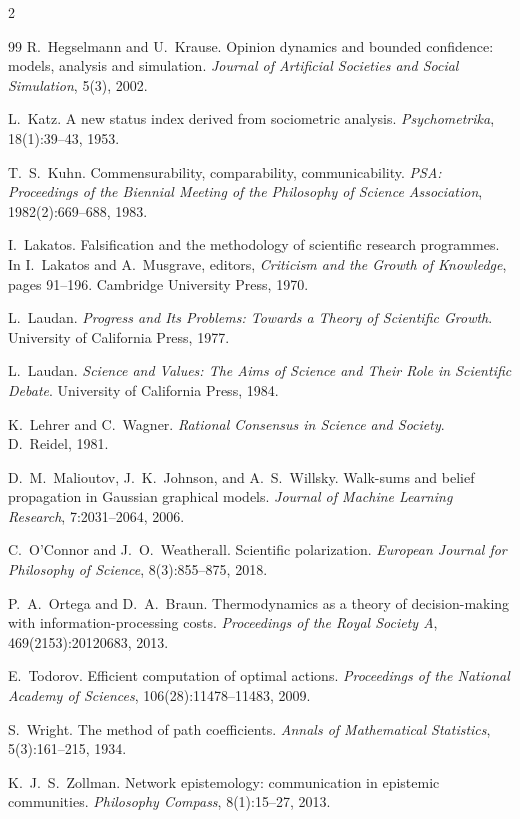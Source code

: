 \documentclass[11pt]{article}
\begin{document}
\begin{multicols}{2}
\begin{thebibliography}{99}
R.~Hegselmann and U.~Krause.
Opinion dynamics and bounded confidence: models, analysis and simulation.
\emph{Journal of Artificial Societies and Social Simulation}, 5(3), 2002.

L.~Katz.
A new status index derived from sociometric analysis. \emph{Psychometrika}, 18(1):39--43, 1953.

T.~S.~Kuhn.
Commensurability, comparability, communicability.
\emph{PSA: Proceedings of the Biennial Meeting of the Philosophy of Science Association},
1982(2):669--688, 1983.

I.~Lakatos.
Falsification and the methodology of scientific research programmes.
In I.~Lakatos and A.~Musgrave, editors, \emph{Criticism and the Growth of Knowledge},
pages 91--196. Cambridge University Press, 1970.

L.~Laudan.
\emph{Progress and Its Problems: Towards a Theory of Scientific Growth}.
University of California Press, 1977.

L.~Laudan.
\emph{Science and Values: The Aims of Science and Their Role in Scientific Debate}.
University of California Press, 1984.

K.~Lehrer and C.~Wagner.
\emph{Rational Consensus in Science and Society}. D.~Reidel, 1981.

D.~M.~Malioutov, J.~K.~Johnson, and A.~S.~Willsky.
Walk-sums and belief propagation in Gaussian graphical models.
\emph{Journal of Machine Learning Research}, 7:2031--2064, 2006.

C.~O'Connor and J.~O.~Weatherall.
Scientific polarization. \emph{European Journal for Philosophy of Science}, 8(3):855--875, 2018.

P.~A.~Ortega and D.~A.~Braun.
Thermodynamics as a theory of decision-making with information-processing costs.
\emph{Proceedings of the Royal Society A}, 469(2153):20120683, 2013.

E.~Todorov.
Efficient computation of optimal actions.
\emph{Proceedings of the National Academy of Sciences}, 106(28):11478--11483, 2009.

S.~Wright.
The method of path coefficients. \emph{Annals of Mathematical Statistics}, 5(3):161--215, 1934.

K.~J.~S.~Zollman.
Network epistemology: communication in epistemic communities.
\emph{Philosophy Compass}, 8(1):15--27, 2013.

\end{thebibliography}
\end{multicols}
\end{document}
